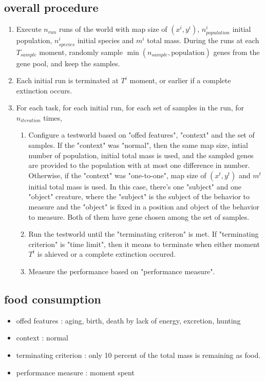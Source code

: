 \documentclass{amsart}
\theoremstyle{definition}
\theoremstyle{remark}
\numberwithin{equation}{section}
\begin{document}
\subsection{overall procedure}
\begin{enumerate}
\item Execute $n_{run}$ runs of the world with map size of $(x^i,y^i)$, $n^i_{population}$ initial population, $n^i_{species}$ initial species and $m^i$ total mass. During the runs at each $T_{sample}$ moment, randomly sample $\min(n_{sample},\text{population})$ genes from the gene pool, and keep the samples. 
\item Each initial run is terminated at $T^i$ moment, or earlier if a complete extinction occurs.
\item For each task, for each initial run, for each set of samples in the run, for $n_{iteration}$ times, 
\begin{enumerate}
\item Configure a testworld based on "offed features", "context" and the set of samples. If the "context" was "normal", then the same map size, intial number of population, initial total mass is used, and the sampled genes are provided to the population  with at most one difference in number. Otherwise, if the "context" was "one-to-one", map size of $(x^t,y^t)$ and $m^t$ initial total mass is used. In this case, there's one "subject" and one "object" creature, where the "subject" is the subject of the behavior to measure and the "object" is fixed in a position and object of the behavior to measure. Both of them have gene chosen among the set of samples.  
\item Run the testworld until the "terminating criteron" is met. If "terminating criterion" is "time limit", then it means to terminate when either moment $T^t$ is ahieved or a complete extinction occured. 
\item Measure the performance based on "performance measure". 
\end{enumerate}
\end{enumerate}
\subsection{food consumption}
\begin{itemize}
\item offed features : aging, birth, death by lack of energy, excretion, hunting
\item context : normal
\item terminating criterion : only 10 percent of the total mass is remaining as food. 
\item performance measure : moment spent
\end{itemize}
\end{document}
